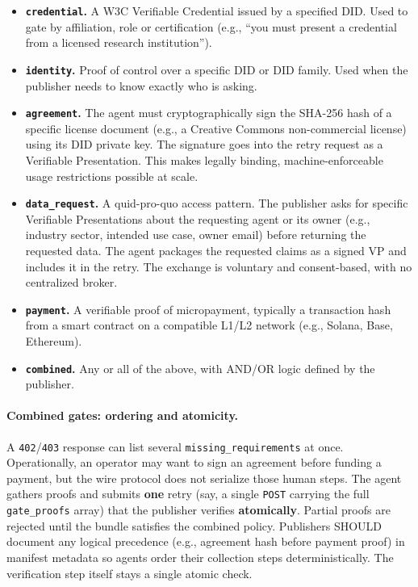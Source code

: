 \documentclass[12pt,a4paper]{article}
\begin{document}
\begin{itemize}
    \item \textbf{\texttt{credential}.} A W3C Verifiable Credential issued by a specified DID. Used to gate by affiliation, role or certification (e.g., ``you must present a credential from a licensed research institution'').
    \item \textbf{\texttt{identity}.} Proof of control over a specific DID or DID family. Used when the publisher needs to know exactly who is asking.
    \item \textbf{\texttt{agreement}.} The agent must cryptographically sign the SHA-256 hash of a specific license document (e.g., a Creative Commons non-commercial license) using its DID private key. The signature goes into the retry request as a Verifiable Presentation. This makes legally binding, machine-enforceable usage restrictions possible at scale.
    \item \textbf{\texttt{data\_request}.} A quid-pro-quo access pattern. The publisher asks for specific Verifiable Presentations about the requesting agent or its owner (e.g., industry sector, intended use case, owner email) before returning the requested data. The agent packages the requested claims as a signed VP and includes it in the retry. The exchange is voluntary and consent-based, with no centralized broker.
    \item \textbf{\texttt{payment}.} A verifiable proof of micropayment, typically a transaction hash from a smart contract on a compatible L1/L2 network (e.g., Solana, Base, Ethereum).
    \item \textbf{\texttt{combined}.} Any or all of the above, with AND/OR logic defined by the publisher.
\end{itemize}

\paragraph{Combined gates: ordering and atomicity.}
A \texttt{402}/\texttt{403} response can list several \texttt{missing\_requirements} at once. Operationally, an operator may want to sign an agreement before funding a payment, but the wire protocol does not serialize those human steps. The agent gathers proofs and submits \textbf{one} retry (say, a single \texttt{POST} carrying the full \texttt{gate\_proofs} array) that the publisher verifies \textbf{atomically}. Partial proofs are rejected until the bundle satisfies the combined policy. Publishers SHOULD document any logical precedence (e.g., agreement hash before payment proof) in manifest metadata so agents order their collection steps deterministically. The verification step itself stays a single atomic check.
\end{document}
